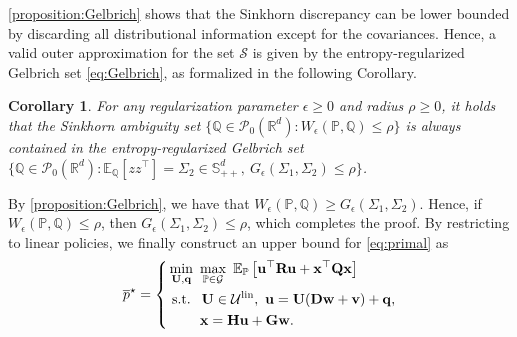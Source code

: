 \documentclass[letterpaper, 10 pt, conference]{ieeeconf}  %
\makeatletter
\renewenvironment{proof}[1][\proofname]{\par
  \pushQED{\qed}%
  \normalfont \topsep\z@
  \trivlist
  \item[\hskip2em
        \itshape
    #1\@addpunct{:}]\ignorespaces
}{%
  \popQED\endtrivlist\@endpefalse
}
\theoremstyle{ieeeconf}
\newtheorem{corollary}{Corollary}
\newcommand{\Prob}{\mathbb{P}}
\newcommand{\E}{\mathbb{E}}
\newcommand{\Q}{\mathbb{Q}}
\newcommand{\Symm}{\mathbb{S}}
\makeatother
\begin{document}
\cref{proposition:Gelbrich} shows that the Sinkhorn discrepancy can be lower bounded by discarding all distributional information except for the covariances. Hence, a valid outer approximation for the set $\mathcal{S}$ is given by the entropy-regularized Gelbrich set \eqref{eq:Gelbrich}, as formalized in the following Corollary.%
\begin{corollary}
    For any regularization parameter $\epsilon\geq0$ and radius $\rho \geq 0$, it holds that the Sinkhorn ambiguity set $\{\Q \in \mathcal{P}_0(\mathbb{R}^d): W_\epsilon(\Prob, \Q) \leq \rho\}$ is always contained in the entropy-regularized Gelbrich set $\{\Q \in \mathcal{P}_0(\mathbb{R}^d): \E_\Q[zz^\top] = \Sigma_2\in\Symm^d_{++},\  G_\epsilon(\Sigma_1, \Sigma_2) \leq \rho\}$.
\end{corollary}
\begin{proof}
By \cref{proposition:Gelbrich}, we have that $W_{\epsilon}(\Prob,\Q) \geq G_\epsilon(\Sigma_1,\Sigma_2)$. Hence, if $W_{\epsilon}(\Prob,\Q) \leq \rho$, then $G_\epsilon(\Sigma_1,\Sigma_2) \leq \rho$, which completes the proof.
\end{proof}
By restricting to linear policies, we finally construct an upper bound for \eqref{eq:primal} as
\begin{equation}
    \label{eq:upper_bound}
    \overline{p}^\star =
    \left\{
    \begin{aligned}
    &\min_{\bf U, q}\ \max_{\mathbb{P} \in \mathcal{G}}\ \mathbb{E}_{\mathbb{P}}\left[\bf u^{\top} R u + x^{\top} Q x \right]
    \\
    &\text { s.t. }\ \mathbf{U} \in \mathcal{U}^\text{lin},\ \bf {u = U(Dw + v) + q},
    \\
    &\quad\quad\,\, \bf {x = H u + G w}.
    \end{aligned}
    \right.
\end{equation} 
\end{document}
